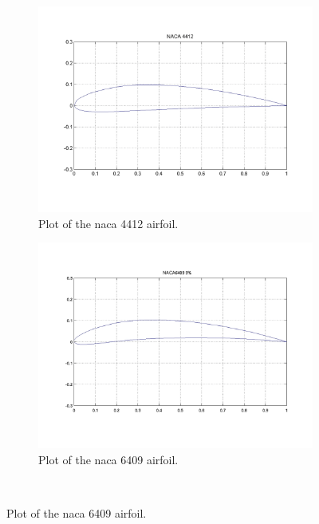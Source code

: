 \begin{figure}[htpb]
    \centering
    \begin{subfigure}{0.49\textwidth}
        \centering
        \includegraphics[width=\textwidth]{Figures/NACA_4412.png}
        \caption{Plot of the \acrshort{naca} 4412 airfoil.}
        \label{fig:naca_4412_plot}
    \end{subfigure}
    \begin{subfigure}{0.49\textwidth}
        \centering
        \includegraphics[width=\textwidth]{Figures/NACA_6409.png}
        \caption{Plot of the \acrshort{naca} 6409 airfoil.}
        \label{fig:naca_6409_plot}
    \end{subfigure} \\

\end{figure}
